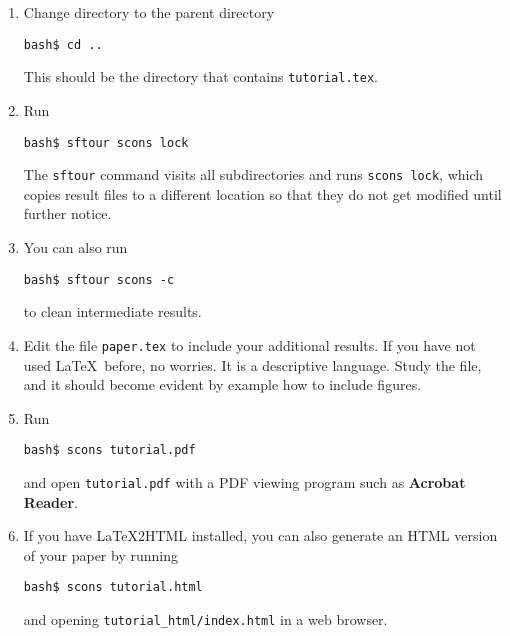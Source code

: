 \begin{enumerate}
\item Change directory to the parent directory
\begin{verbatim}
bash$ cd ..
\end{verbatim}
This should be the directory that contains \texttt{tutorial.tex}.
\item Run
\begin{verbatim}
bash$ sftour scons lock
\end{verbatim}
The \texttt{sftour} command visits all subdirectories and runs \texttt{scons lock}, which copies result files to a different location so that they do not get modified until further notice.
\item You can also run
\begin{verbatim}
bash$ sftour scons -c
\end{verbatim}
to clean intermediate results.
\item Edit the file \texttt{paper.tex} to include your additional results. If you have not used \LaTeX\ before, no worries. It is a descriptive language. Study the file, and it should become evident by example how to include figures.
\item Run
\begin{verbatim}
bash$ scons tutorial.pdf
\end{verbatim}
and open \texttt{tutorial.pdf} with a PDF viewing program such as \textbf{Acrobat Reader}. 

\item If you have \LaTeX2HTML installed, you can also generate an HTML version of your paper by running
\begin{verbatim}
bash$ scons tutorial.html
\end{verbatim}
and opening \verb#tutorial_html/index.html# in a web browser.
\end{enumerate}

%







